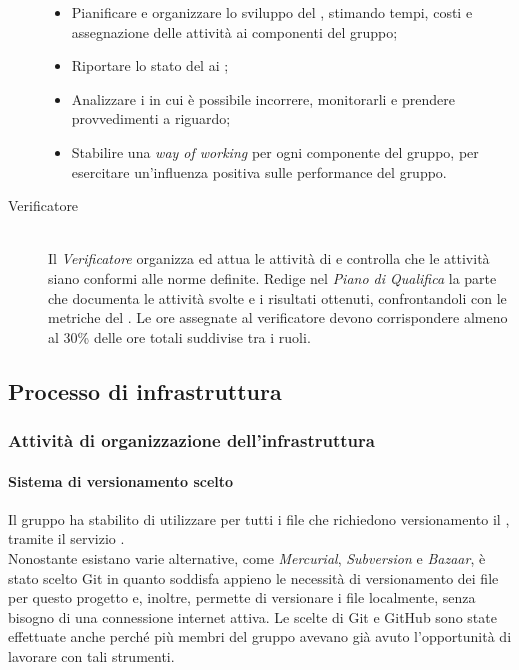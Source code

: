 \begin{description}
\begin{itemize}
  \item Pianificare e organizzare lo sviluppo del , stimando tempi, costi e assegnazione delle attivit\`a ai componenti del gruppo;
  \item Riportare lo stato del  ai ;
  \item Analizzare i  in cui è possibile incorrere, monitorarli e prendere provvedimenti a riguardo;
  \item Stabilire una \textit{way of working} per ogni componente del gruppo, per esercitare un'influenza positiva sulle performance del gruppo.
    
  \end{itemize}

\item[Verificatore] \hfill \\ Il \textit{Verificatore} organizza ed attua le attivit\`a di  e controlla che le attivit\`a siano conformi alle norme definite. Redige nel \textit{Piano di Qualifica} la parte che documenta le attivit\`a svolte e i risultati ottenuti, confrontandoli con le metriche del \PianoDiQualifica. Le ore assegnate al verificatore devono corrispondere almeno al 30\% delle ore totali suddivise tra i ruoli.
  
\end{description}



\subsection{Processo di infrastruttura}

\subsubsection{Attività di organizzazione dell'infrastruttura}

\paragraph*{Sistema di versionamento scelto} Il gruppo ha stabilito di utilizzare per tutti i file che richiedono versionamento 
il  , tramite il servizio . \\
Nonostante esistano varie alternative, come \textit{Mercurial}, \textit{Subversion} e \textit{Bazaar}, è stato scelto Git in quanto soddisfa
appieno le necessità di versionamento dei file per questo progetto e, inoltre, permette di versionare i file localmente, senza bisogno di una connessione
internet attiva. Le scelte di Git e GitHub sono state effettuate anche perché più membri del gruppo avevano già avuto l'opportunità 
di lavorare con tali strumenti. \\

